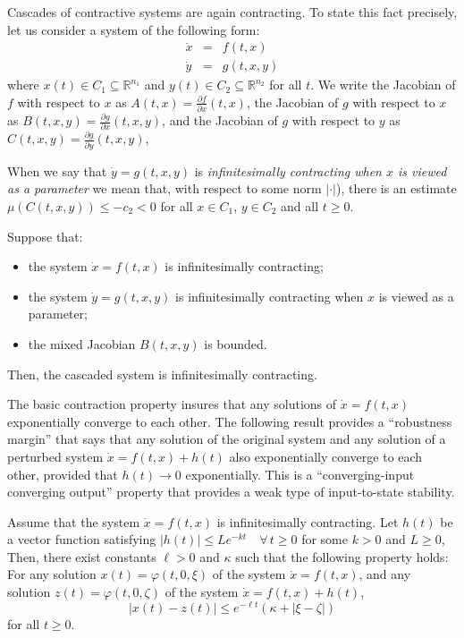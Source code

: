 \documentclass{svmult}
\newcommand{\opteqn}[1]{$#1$}
\newcommand{\R}{{\mathbb R}}  %
\newcommand{\abs}[1]{\left\vert #1 \right\vert}
\newcommand{\be}[1]{\begin{equation}\label{#1}}
\newcommand{\ee}{\end{equation}}
\newcommand{\beqn}{\begin{eqnarray*}}
\newcommand{\eeqn}{\end{eqnarray*}}
\newcommand{\bi}{\begin{itemize}}
\newcommand{\ei}{\end{itemize}}
\newcommand{\cc}{c}
\begin{document}
Cascades of contractive systems are again contracting.  To state this fact
precisely, let us consider a system of the following form:
\beqn
\dot  x &=& f(t,x)\\
\dot  y &=& g(t,x,y)
\eeqn
where $x(t)\in C_1\subseteq \R^{n_1}$ and $y(t)\in C_2\subseteq \R^{n_2}$ for
all $t$.
We write the Jacobian of $f$ with respect to $x$ as
$A(t,x) = \frac{\partial f}{\partial x}(t,x)$,
the Jacobian of $g$ with respect to $x$ as
$B(t,x,y) = \frac{\partial g}{\partial x}(t,x,y)$,
and the Jacobian of $g$ with respect to $y$ as
$C(t,x,y) = \frac{\partial g}{\partial y}(t,x,y)$,

When we say that $\dot y=g(t,x,y)$ is \emph{infinitesimally contracting
when $x$ is viewed as a parameter} we mean that, with respect
to some norm $\abs{\cdot }$), there is an estimate
$\mu (C(t,x,y))\leq  -\cc_2<0$
for all $x\in C_1$, $y\in C_2$ and all $t\geq 0$.

\begin{theorem}\label{theo:cascades}
Suppose that:
\bi
\item
the system $\dot x=f(t,x)$ is infinitesimally contracting;
\item
the system $\dot y=g(t,x,y)$ is infinitesimally contracting when $x$ is
viewed as a parameter;
\item
the mixed Jacobian $B(t,x,y)$ is bounded.
\ei
Then, the cascaded system is infinitesimally contracting.
\end{theorem}

The basic contraction property insures that any solutions of $\dot x=f(t,x)$
exponentially converge to each other.  The following result provides
a ``robustness margin'' that says that any solution of the original system
and any solution of a perturbed system $\dot x=f(t,x)+h(t)$ also
exponentially converge to each other, provided that $h(t)\rightarrow 0$ exponentially.
This is a ``converging-input converging output'' property that provides a weak
type of input-to-state stability.

\begin{theorem}
\label{theo:fhc}
Assume that the system $\dot x=f(t,x)$ is infinitesimally contracting.
Let $h(t)$ be a vector function satisfying
\opteqn{
\abs{h(t)}\leq Le^{-kt} \quad \forall\,t\geq 0
}
for some $k>0$ and $L\geq 0$,
Then, there exist constants $\ell>0$ and $\kappa $ such that the following property
holds:
For any solution $x(t)=\varphi(t,0,\xi )$ of the system $\dot x=f(t,x)$,
and any solution $z(t)=\varphi(t,0,\zeta )$ of the system $\dot x=f(t,x)+h(t)$,
\be{eqn:estimatefh}
\abs{x(t)-z(t)} \leq  e^{-\ell t} \left(\kappa  +  \abs{\xi -\zeta }\right)
\ee
for all $t\geq 0$.
\end{theorem}
\end{document}
